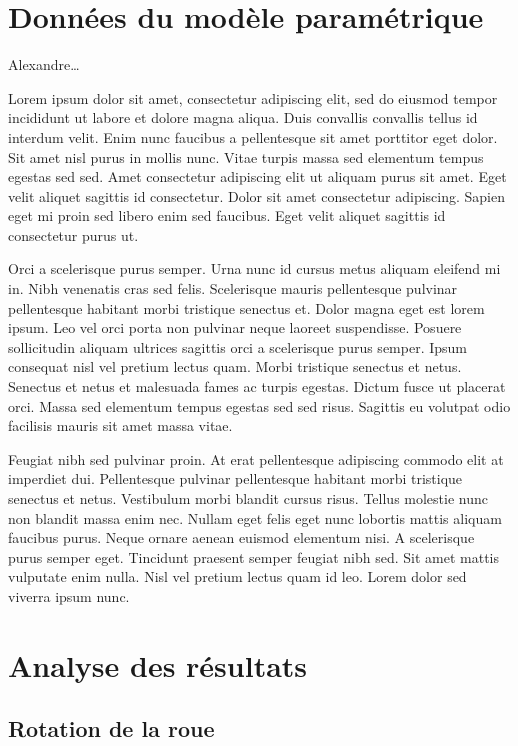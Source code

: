 \documentclass{article}
\begin{document}
\newpage
\tableofcontents

\newpage
\section{Données du modèle paramétrique}

Alexandre\dots

Lorem ipsum dolor sit amet, consectetur adipiscing elit, sed do eiusmod tempor incididunt ut labore et dolore magna aliqua. Duis convallis convallis tellus id interdum velit. Enim nunc faucibus a pellentesque sit amet porttitor eget dolor. Sit amet nisl purus in mollis nunc. Vitae turpis massa sed elementum tempus egestas sed sed. Amet consectetur adipiscing elit ut aliquam purus sit amet. Eget velit aliquet sagittis id consectetur. Dolor sit amet consectetur adipiscing. Sapien eget mi proin sed libero enim sed faucibus. Eget velit aliquet sagittis id consectetur purus ut.

Orci a scelerisque purus semper. Urna nunc id cursus metus aliquam eleifend mi in. Nibh venenatis cras sed felis. Scelerisque mauris pellentesque pulvinar pellentesque habitant morbi tristique senectus et. Dolor magna eget est lorem ipsum. Leo vel orci porta non pulvinar neque laoreet suspendisse. Posuere sollicitudin aliquam ultrices sagittis orci a scelerisque purus semper. Ipsum consequat nisl vel pretium lectus quam. Morbi tristique senectus et netus. Senectus et netus et malesuada fames ac turpis egestas. Dictum fusce ut placerat orci. Massa sed elementum tempus egestas sed sed risus. Sagittis eu volutpat odio facilisis mauris sit amet massa vitae.

Feugiat nibh sed pulvinar proin. At erat pellentesque adipiscing commodo elit at imperdiet dui. Pellentesque pulvinar pellentesque habitant morbi tristique senectus et netus. Vestibulum morbi blandit cursus risus. Tellus molestie nunc non blandit massa enim nec. Nullam eget felis eget nunc lobortis mattis aliquam faucibus purus. Neque ornare aenean euismod elementum nisi. A scelerisque purus semper eget. Tincidunt praesent semper feugiat nibh sed. Sit amet mattis vulputate enim nulla. Nisl vel pretium lectus quam id leo. Lorem dolor sed viverra ipsum nunc.

\section{Analyse des résultats}
\subsection{Rotation de la roue}
\end{document}
